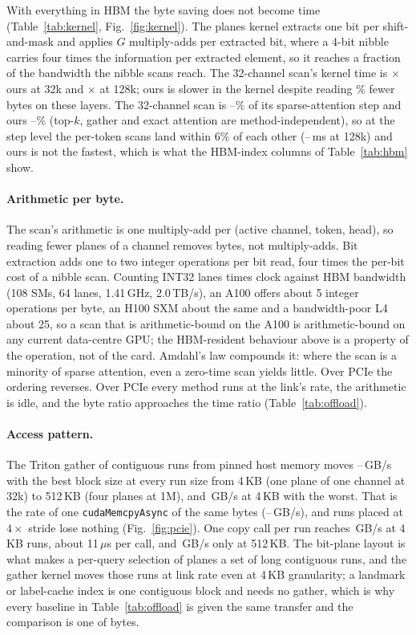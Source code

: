 \documentclass[10pt,twocolumn]{article}
\begin{document}
With everything in HBM the byte saving does not become time (Table~\ref{tab:kernel}, Fig.~\ref{fig:kernel}). The planes kernel extracts one bit per shift-and-mask and applies $G$ multiply-adds per extracted bit, where a 4-bit nibble carries four times the information per extracted element, so it reaches a fraction of the bandwidth the nibble scans reach. The 32-channel scan's kernel time is $\times$ ours at 32k and $\times$ at 128k; ours is slower in the kernel despite reading \% fewer bytes on these layers. The 32-channel scan is \scanShareShort--\scanShareLong\% of its sparse-attention step and ours \scanShareOursShort--\scanShareOursLong\% (top-$k$, gather and exact attention are method-independent), so at the step level the per-token scans land within 6\% of each other (\hbmScanMin--\hbmScanMax\,ms at 128k) and ours is not the fastest, which is what the HBM-index columns of Table~\ref{tab:hbm} show.


\paragraph{Arithmetic per byte.} The scan's arithmetic is one multiply-add per (active channel, token, head), so reading fewer planes of a channel removes bytes, not multiply-adds. Bit extraction adds one to two integer operations per bit read, four times the per-bit cost of a nibble scan. Counting INT32 lanes times clock against HBM bandwidth (108 SMs, 64 lanes, 1.41\,GHz, 2.0\,TB/s), an A100 offers about 5 integer operations per byte, an H100 SXM about the same and a bandwidth-poor L4 about 25, so a scan that is arithmetic-bound on the A100 is arithmetic-bound on any current data-centre GPU; the HBM-resident behaviour above is a property of the operation, not of the card. Amdahl's law compounds it: where the scan is a minority of sparse attention, even a zero-time scan yields little. Over PCIe the ordering reverses. Over PCIe every method runs at the link's rate, the arithmetic is idle, and the byte ratio approaches the time ratio (Table~\ref{tab:offload}).

\paragraph{Access pattern.} The Triton gather of contiguous runs from pinned host memory moves \pcieGatherMin--\pcieGatherMax\,GB/s with the best block size at every run size from 4\,KB (one plane of one channel at 32k) to 512\,KB (four planes at 1M), and \pcieGatherWorst\,GB/s at 4\,KB with the worst. That is the rate of one \texttt{cudaMemcpyAsync} of the same bytes (\pcieMemcpyMin--\pcieMemcpyMax\,GB/s), and runs placed at $4\times$ stride lose nothing (Fig.~\ref{fig:pcie}). One copy call per run reaches \pciePercallMin\,GB/s at 4\,KB runs, about 11\,$\mu$s per call, and \pciePercallMax\,GB/s only at 512\,KB. The bit-plane layout is what makes a per-query selection of planes a set of long contiguous runs, and the gather kernel moves those runs at link rate even at 4\,KB granularity; a landmark or label-cache index is one contiguous block and needs no gather, which is why every baseline in Table~\ref{tab:offload} is given the same transfer and the comparison is one of bytes.
\end{document}
